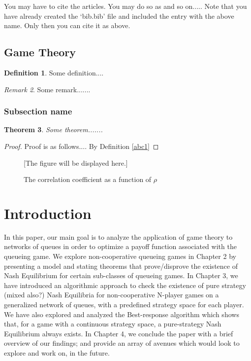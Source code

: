 \documentclass[12pt,a4paper]{report}
\theoremstyle{plain}
\newtheorem{theorem}{Theorem}[section]
\theoremstyle{definition}
\newtheorem{definition}[theorem]{Definition}
\theoremstyle{remark}
\newtheorem{remark}[theorem]{Remark}
\begin{document}
You may have to cite the articles.  You may do so as \cite{laan} and so on.....
Note that you have already created the `bib.bib' file and included the entry with the above name. Only
then you can cite it as above.

\section{Game Theory}
\begin{definition}\label{abc2}
Some definition....
\end{definition}

\begin{remark}
Some remark.......
\end{remark}

\subsection{Subsection name}

\begin{theorem}
Some theorem.......
\end{theorem}

\begin{proof}
Proof is as follows.... By Definition \ref{abc1}
\end{proof}


\begin{figure}[h]

[The figure will be displayed here.]

\caption{The correlation coefficient as a function of $\rho$}
\end{figure}





\chapter{Introduction}

In this paper, our main goal is to analyze the application of game theory to networks of queues in order to optimize a payoff function associated with the queueing game. We explore non-cooperative queueing games in Chapter 2 by presenting a model and stating theorems that prove/disprove the existence of Nash Equilibrium for certain sub-classes of queueing games.
In Chapter 3, we have introduced an algorithmic approach to check the existence of pure strategy (mixed also?) Nash Equilibria for non-cooperative N-player games on a generalized network of queues, with a predefined strategy space for each player. We have also explored and analyzed the Best-response algorithm which shows that, for a game with a continuous strategy space, a pure-strategy Nash Equilibrium always exists.
In Chapter 4, we conclude the paper with a brief overview of our findings; and provide an array of avenues which would look to explore and work on, in the future.
\end{document}
